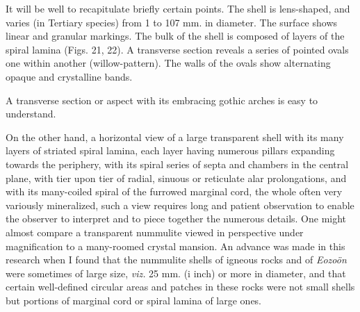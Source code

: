 \documentclass[a4paper, 12pt, oneside]{article}
\begin{document}
It will be well to recapitulate briefly certain points. The shell is lens-shaped, and varies (in Tertiary species) from 1 to 107 mm. in diameter. The surface shows linear and granular markings. The bulk of the shell is composed of layers of the spiral lamina (Figs. 21, 22). A transverse section reveals a series of pointed ovals one within another (willow-pattern). The walls of the ovals show alternating opaque and crystalline bands.

A transverse section or aspect with its embracing gothic arches is easy to understand.

On the other hand, a horizontal view of a large transparent shell with its many layers of striated spiral lamina, each layer having numerous pillars expanding towards the periphery, with its spiral series of septa and chambers in the central plane, with tier upon tier of radial, sinuous or reticulate alar prolongations, and with its many-coiled spiral of the furrowed marginal cord, the whole often very variously mineralized, such a view requires long and patient observation to enable the observer to interpret and to piece together the numerous details. One might almost compare a transparent nummulite viewed in perspective under magnification to a many-roomed crystal mansion. An advance was made in this research when I found that the nummulite shells of igneous rocks and of \emph{Eozoön} were sometimes of large size, \emph{viz.} 25 mm. (i inch) or more in diameter, and that certain well-defined circular areas and patches in these rocks were not small shells but portions of marginal cord or spiral lamina of large ones.
\end{document}
